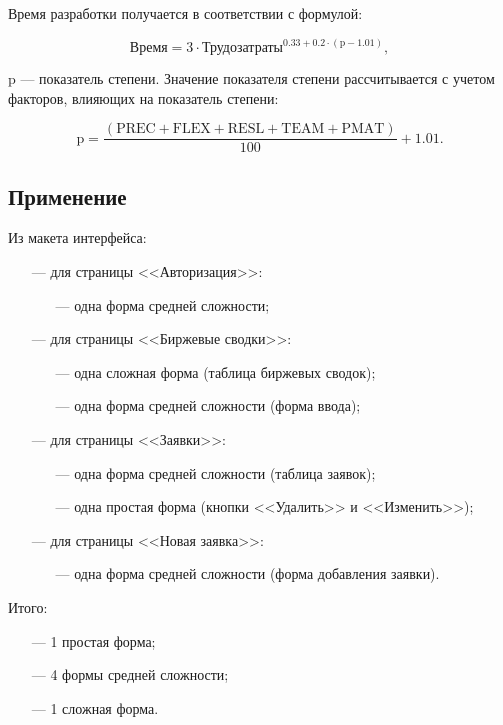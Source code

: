 Время разработки получается в соответствии с формулой:

$$\text{Время} = 3 \cdot \text{Трудозатраты}^{0.33 + 0.2 \cdot (\text{p} - 1.01)},$$

 $\text{p}$ --- показатель степени. Значение показателя степени рассчитывается с учетом факторов, влияющих на показатель степени:

$$\text{p} = \frac{(\text{PREC} + \text{FLEX} + \text{RESL} + \text{TEAM} + \text{PMAT})}{100} + 1.01.$$

\subsection*{Применение}

Из макета интерфейса:

\begin{itemize}
    \item[---] для страницы <<Авторизация>>:
        \begin{itemize}
            \item[---] одна форма средней сложности;
        \end{itemize}
    \item[---] для страницы <<Биржевые сводки>>:
        \begin{itemize}
            \item[---] одна сложная форма (таблица биржевых сводок);
            \item[---] одна форма средней сложности (форма ввода);
        \end{itemize}
    \item[---] для страницы <<Заявки>>:
        \begin{itemize}
            \item[---] одна форма средней сложности (таблица заявок);
            \item[---] одна простая форма (кнопки <<Удалить>> и <<Изменить>>);
        \end{itemize}
    \item[---] для страницы <<Новая заявка>>:
        \begin{itemize}
            \item[---] одна форма средней сложности (форма добавления заявки).
        \end{itemize}
\end{itemize}

Итого:

\begin{itemize}
    \item[---] 1 простая форма;
    \item[---] 4 формы средней сложности;
    \item[---] 1 сложная форма.
\end{itemize}


